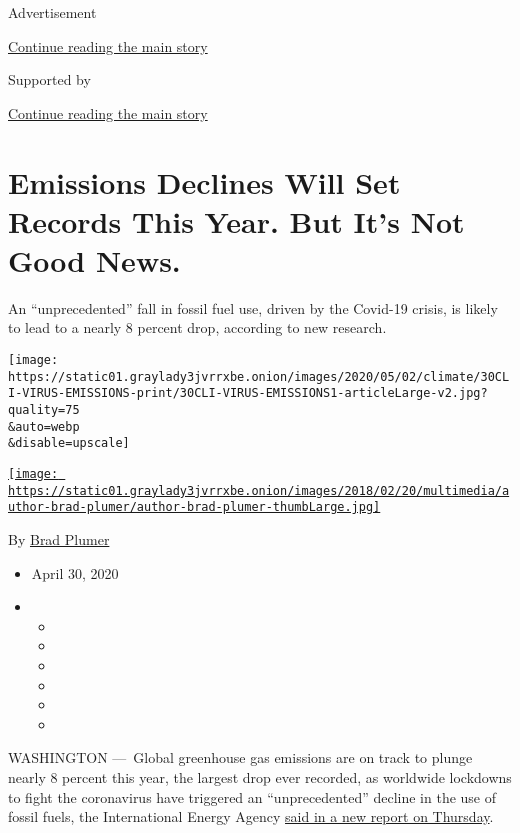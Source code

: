 Advertisement

\protect\hyperlink{after-top}{Continue reading the main story}

Supported by

\protect\hyperlink{after-sponsor}{Continue reading the main story}

\hypertarget{emissions-declines-will-set-records-this-year-but-its-not-good-news}{%
\section{Emissions Declines Will Set Records This Year. But It's Not
Good
News.}\label{emissions-declines-will-set-records-this-year-but-its-not-good-news}}

An ``unprecedented'' fall in fossil fuel use, driven by the Covid-19
crisis, is likely to lead to a nearly 8 percent drop, according to new
research.

\texttt{[image: https://static01.graylady3jvrrxbe.onion/images/2020/05/02/climate/30CLI-VIRUS-EMISSIONS-print/30CLI-VIRUS-EMISSIONS1-articleLarge-v2.jpg?quality=75\\\&auto=webp\\\&disable=upscale]}

\href{https://www.nytimes3xbfgragh.onion/by/brad-plumer}{\texttt{[image: https://static01.graylady3jvrrxbe.onion/images/2018/02/20/multimedia/author-brad-plumer/author-brad-plumer-thumbLarge.jpg]}}

By \href{https://www.nytimes3xbfgragh.onion/by/brad-plumer}{Brad Plumer}

\begin{itemize}
\item
  April 30, 2020
\item
  \begin{itemize}
  \item
  \item
  \item
  \item
  \item
  \item
  \end{itemize}
\end{itemize}

WASHINGTON ---~Global greenhouse gas emissions are on track to plunge
nearly 8 percent this year, the largest drop ever recorded, as worldwide
lockdowns to fight the coronavirus have triggered an ``unprecedented''
decline in the use of fossil fuels, the International Energy Agency
\href{https://www.iea.org/reports/global-energy-review-2020}{said in a
new report on Thursday}.

